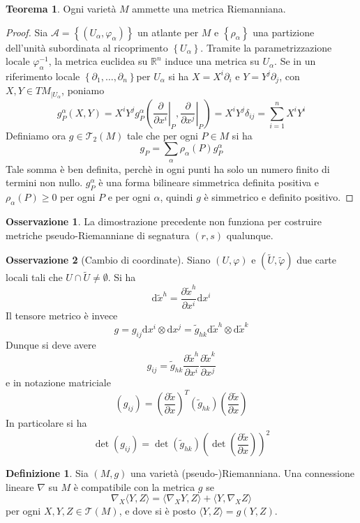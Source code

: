 \documentclass[a4paper,11pt]{article}
\theoremstyle{definition}
\newtheorem{osservazione}{Osservazione}[section]
\newtheorem{definizione}{Definizione}[section]
\theoremstyle{theorem}
\newtheorem{teorema}{Teorema}[section]
\newcommand{\dif}{\mathrm{d}}
\newcommand{\R}{\mathbb{R}}
\newcommand{\T}{\mathcal{T}}
\begin{document}
\begin{teorema}
	Ogni varietà $M$ ammette una metrica Riemanniana.
\end{teorema}
\begin{proof}
	Sia $\mathcal{A}=\left\{(U_{\alpha},\varphi_{\alpha})\right\}$ un atlante per $M$ e $\left\{\rho_{\alpha}\right\}$ una partizione dell'unità subordinata al ricoprimento $\left\{U_{\alpha}\right\}$. Tramite la parametrizzazione locale $\varphi_{\alpha}^{-1}$, la metrica euclidea su $\R^n$ induce una metrica su $U_{\alpha}$. Se in un riferimento locale $\left\{\partial_1,\dots,\partial_n\right\}$per $U_{\alpha}$ si ha $X=X^i\partial_i$ e $Y=Y^j\partial_j$, con $X,Y\in TM_{|U_{\alpha}}$, poniamo
	\[g_P^{\alpha}(X,Y)=X^iY^jg^{\alpha}_P\left(\left.\frac{\partial}{\partial x^i}\right|_P,\left.\frac{\partial}{\partial x^j}\right|_P\right)=X^iY^j\delta_{ij}=\sum_{i=1}^{n}X^iY^i\]
	Definiamo ora $g\in\T_2(M)$ tale che per ogni $P\in M$ si ha
	\[g_P=\sum_{\alpha}\rho_{\alpha}(P)g^{\alpha}_P\]
	Tale somma è ben definita, perchè in ogni punti ha solo un numero finito di termini non nullo. $g^{\alpha}_P$ è una forma bilineare simmetrica definita positiva e $\rho_{\alpha}(P)\geq0$ per ogni $P$ e per ogni $\alpha$, quindi $g$ è simmetrico e definito positivo.
\end{proof}
\begin{osservazione}
	La dimostrazione precedente non funziona per costruire metriche pseudo-Riemanniane di segnatura $(r,s)$ qualunque.
\end{osservazione}
\begin{osservazione}[Cambio di coordinate]
	Siano $(U,\varphi)$ e $(\tilde{U},\tilde{\varphi})$ due carte locali tali che $U\cap\tilde{U}\neq\emptyset$. Si ha
	\[\dif\tilde{x}^h=\frac{\partial\tilde{x}^h}{\partial x^i}\dif x^i\]
	Il tensore metrico è invece
	\[g=g_{ij}\dif x^i\otimes\dif x^j=\tilde{g}_{hk}\dif\tilde{x}^h\otimes\dif\tilde{x}^k\]
	Dunque si deve avere
	\[g_{ij}=\tilde{g}_{hk}\frac{\partial\tilde{x}^h}{\partial x^i}\frac{\partial\tilde{x}^k}{\partial x^j}\]
	e in notazione matriciale
	\[\left(g_{ij}\right)=\left(\frac{\partial\tilde{x}}{\partial x}\right)^T\left(\tilde{g}_{hk}\right)\left(\frac{\partial\tilde{x}}{\partial x}\right)\]
	In particolare si ha
	\[\det\left(g_{ij}\right)=\det\left(\tilde{g}_{hk}\right)\left(\det\left(\frac{\partial \tilde{x}}{\partial x}\right)\right)^2\]
\end{osservazione}
\begin{definizione}
	Sia $(M,g)$ una varietà (pseudo-)Riemanniana. Una connessione lineare $\nabla$ su $M$ è compatibile con la metrica $g$ se
	\[\nabla_X\langle Y,Z\rangle=\langle\nabla_XY,Z\rangle+\langle Y,\nabla_XZ\rangle\]
	per ogni $X,Y,Z\in\T(M)$, e dove si è posto $\langle Y,Z\rangle=g(Y,Z)$.
\end{definizione}
\end{document}

